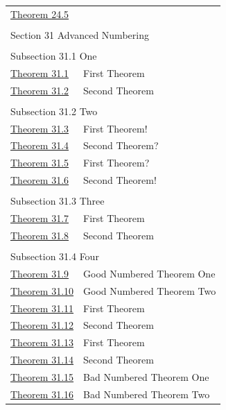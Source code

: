 \documentclass{amsart}
\theoremstyle{plain}%
\theoremstyle{definition}%
\theoremstyle{remark}%
\numberwithin{equation}{section}
\begin{document}
\begin{appendices}
\begin{longtable}[l]{ll}
\hyperref[theorem-detached]{Theorem 24.5}& \\
\multicolumn{2}{l}{\null}\\[1.5ex] \multicolumn{2}{l}{\large Section 31 Advanced Numbering}\\[0.5ex]
\multicolumn{2}{l}{\null}\\[1.5ex] \multicolumn{2}{l}{\large Subsection 31.1 One}\\[0.5ex]
\hyperref[theorem-number-01]{Theorem 31.1}& First Theorem\\
\hyperref[theorem-number-02]{Theorem 31.2}& Second Theorem\\
\multicolumn{2}{l}{\null}\\[1.5ex] \multicolumn{2}{l}{\large Subsection 31.2 Two}\\[0.5ex]
\hyperref[theorem-number-03]{Theorem 31.3}& First Theorem!\\
\hyperref[theorem-number-04]{Theorem 31.4}& Second Theorem?\\
\hyperref[theorem-number-05]{Theorem 31.5}& First Theorem?\\
\hyperref[theorem-number-06]{Theorem 31.6}& Second Theorem!\\
\multicolumn{2}{l}{\null}\\[1.5ex] \multicolumn{2}{l}{\large Subsection 31.3 Three}\\[0.5ex]
\hyperref[theorem-number-07]{Theorem 31.7}& First Theorem\\
\hyperref[theorem-number-08]{Theorem 31.8}& Second Theorem\\
\multicolumn{2}{l}{\null}\\[1.5ex] \multicolumn{2}{l}{\large Subsection 31.4 Four}\\[0.5ex]
\hyperref[theorem-good-one]{Theorem 31.9}& Good Numbered Theorem One\\
\hyperref[theorem-good-two]{Theorem 31.10}& Good Numbered Theorem Two\\
\hyperref[theorem-number-09]{Theorem 31.11}& First Theorem\\
\hyperref[theorem-number-10]{Theorem 31.12}& Second Theorem\\
\hyperref[theorem-number-11]{Theorem 31.13}& First Theorem\\
\hyperref[theorem-number-12]{Theorem 31.14}& Second Theorem\\
\hyperref[theorem-bad-one]{Theorem 31.15}& Bad Numbered Theorem One\\
\hyperref[theorem-bad-two]{Theorem 31.16}& Bad Numbered Theorem Two\\

\end{longtable}
\end{appendices}
\end{document}

